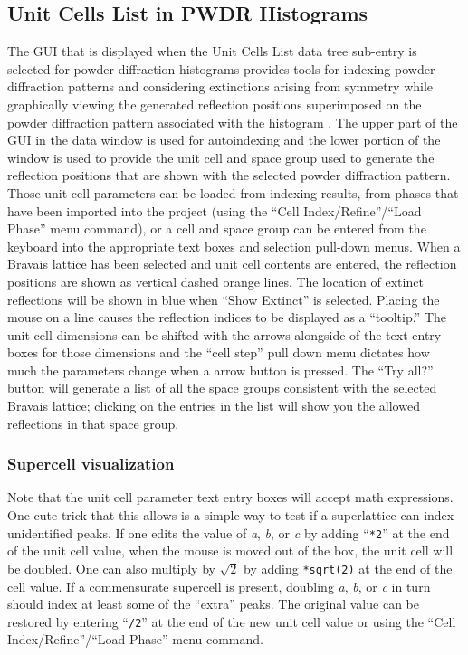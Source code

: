 \subsection{Unit Cells List in PWDR Histograms}
The GUI that is displayed when the Unit Cells List data tree sub-entry is selected for powder diffraction histograms provides tools for indexing powder diffraction patterns and considering extinctions arising from symmetry while graphically viewing the generated reflection positions superimposed on the powder diffraction pattern associated with the histogram . The upper part of the GUI in the data window is used for autoindexing and the lower portion of the window is used to provide the unit cell and space group used to generate the reflection positions that are shown with the selected powder diffraction pattern. Those unit cell parameters can be loaded from indexing results, from phases that have been imported into the project (using the ``Cell Index/Refine''/``Load Phase'' menu command), or a cell and space group can be entered from the keyboard into the appropriate text boxes and selection pull-down menus. When a Bravais lattice has been selected and unit cell contents are entered, the reflection positions are shown as vertical dashed orange lines. The location of extinct reflections will be shown in blue when ``Show Extinct'' is selected. Placing the mouse on a line causes the reflection indices to be displayed as a ``tooltip.'' The unit cell dimensions can be shifted with the arrows alongside of the text entry boxes for those dimensions and the ``cell step'' pull down menu dictates how much the parameters change when a arrow button is pressed. The ``Try all?'' button will generate a list of all the space groups consistent with the selected Bravais lattice; clicking on the entries in the list will show you the allowed reflections in that space group. 

\subsubsection{Supercell visualization}
\label{ref:supercellindexing}
Note that the unit cell parameter text entry boxes will accept math expressions. One cute trick that this allows is a simple way to test if a superlattice can index unidentified peaks. If one edits the value of \textit{a},  \textit{b}, or \textit{c} by adding ``\texttt{*2}'' at the end of the unit cell value, when the mouse is moved out of the box, the unit cell will be doubled. One can also multiply by $\sqrt2$  by adding \texttt{*sqrt(2)} at the end of the cell value. If a commensurate supercell is present, doubling \textit{a},  \textit{b}, or \textit{c} in turn should index at least some of the ``extra'' peaks. The original value can be restored by entering ``\texttt{/2}'' at the end of the new unit cell value or using the ``Cell Index/Refine''/``Load Phase'' menu command. 

